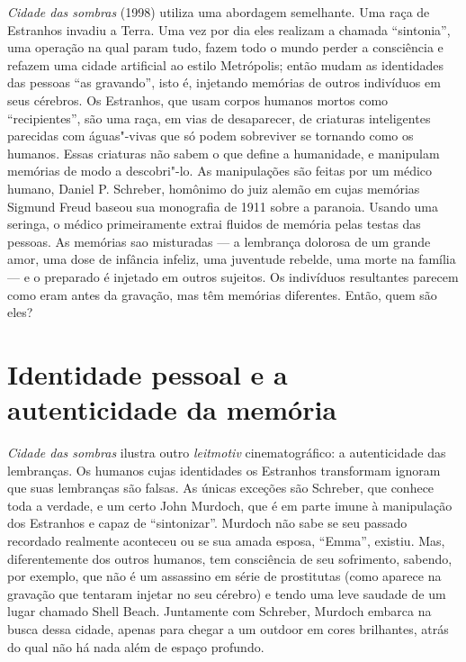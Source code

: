 \emph{Cidade das sombras} (1998) utiliza uma abordagem semelhante. Uma
raça de Estranhos invadiu a Terra. Uma vez por dia eles realizam a
chamada ``sintonia'', uma operação na qual param tudo, fazem todo o
mundo perder a consciência e refazem uma cidade artificial ao estilo
Metrópolis; então mudam as identidades das pessoas ``as gravando'', isto
é, injetando memórias de outros indivíduos em seus cérebros. Os
Estranhos, que usam corpos humanos mortos como ``recipientes'', são uma
raça, em vias de desaparecer, de criaturas inteligentes parecidas com
águas"-vivas que só podem sobreviver se tornando como os humanos. Essas
criaturas não sabem o que define a humanidade, e manipulam memórias de
modo a descobri"-lo. As manipulações são feitas por um médico humano,
Daniel P. Schreber, homônimo do juiz alemão em cujas memórias Sigmund
Freud baseou sua monografia de 1911 sobre a paranoia. Usando uma
seringa, o médico primeiramente extrai fluidos de memória pelas testas
das pessoas. As memórias sao misturadas --- a lembrança dolorosa de um
grande amor, uma dose de infância infeliz, uma juventude rebelde, uma
morte na família --- e o preparado é injetado em outros sujeitos. Os
indivíduos resultantes parecem como eram antes da gravação, mas têm
memórias diferentes. Então, quem são eles?

\section*{Identidade pessoal e a autenticidade da memória}

\emph{Cidade das sombras} ilustra outro \emph{leitmotiv}
cinematográfico: a autenticidade das lembranças. Os humanos cujas
identidades os Estranhos transformam ignoram que suas lembranças são
falsas. As únicas exceções são Schreber, que conhece toda a verdade, e
um certo John Murdoch, que é em parte imune à manipulação dos Estranhos
e capaz de ``sintonizar''. Murdoch não sabe se seu passado recordado
realmente aconteceu ou se sua amada esposa, ``Emma'', existiu. Mas,
diferentemente dos outros humanos, tem consciência de seu sofrimento,
sabendo, por exemplo, que não é um assassino em série de prostitutas
(como aparece na gravação que tentaram injetar no seu cérebro) e tendo
uma leve saudade de um lugar chamado Shell Beach. Juntamente com
Schreber, Murdoch embarca na busca dessa cidade, apenas para chegar a um
outdoor em cores brilhantes, atrás do qual não há nada além de espaço
profundo.

